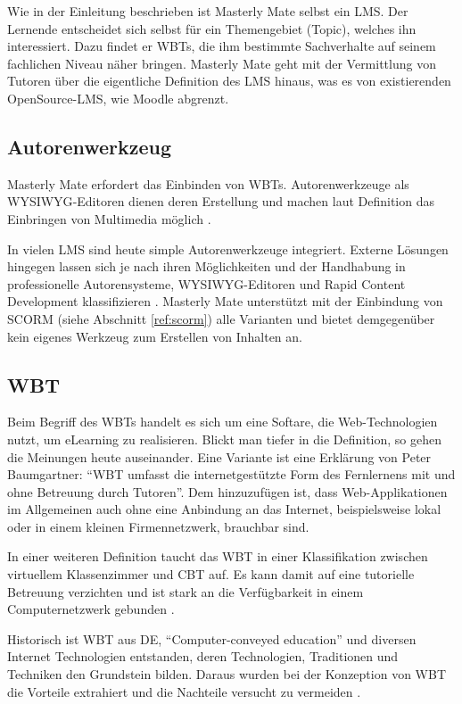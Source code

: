 Wie in der Einleitung beschrieben ist Masterly Mate selbst ein LMS. Der Lernende
entscheidet sich selbst für ein Themengebiet (Topic), welches ihn interessiert.
Dazu findet er WBTs, die ihm bestimmte Sachverhalte auf seinem fachlichen Niveau
näher bringen. Masterly Mate geht mit der Vermittlung von Tutoren über die
eigentliche Definition des LMS hinaus, was es von existierenden OpenSource-LMS,
wie Moodle abgrenzt.

\subsection{Autorenwerkzeug}
Masterly Mate erfordert das Einbinden von WBTs. Autorenwerkzeuge als
\ac{WYSIWYG}-Editoren dienen deren Erstellung und machen laut Definition das
Einbringen von Multimedia möglich \cite{niegemann:2004}. 

In vielen LMS sind heute simple Autorenwerkzeuge integriert. Externe Lösungen
hingegen lassen sich je nach ihren Möglichkeiten und der Handhabung in
professionelle Autorensysteme, WYSIWYG-Editoren und Rapid Content Development
klassifizieren \cite{niegemann:2004}. Masterly Mate unterstützt mit der
Einbindung von SCORM (siehe Abschnitt \ref{ref:scorm}) alle Varianten und bietet
demgegenüber kein eigenes Werkzeug zum Erstellen von Inhalten an.

\subsection{WBT}
Beim Begriff des WBTs handelt es sich um eine Softare, die Web-Technologien
nutzt, um eLearning zu realisieren. Blickt man tiefer in die Definition, so
gehen die Meinungen heute auseinander. Eine Variante ist eine Erklärung von
Peter Baumgartner: "`WBT umfasst die internetgestützte Form des Fernlernens mit
und ohne Betreuung durch Tutoren"'\cite{baumgartner:2002}. Dem hinzuzufügen ist,
dass Web-Applikationen im Allgemeinen auch ohne eine Anbindung an das Internet,
beispielsweise lokal oder in einem kleinen Firmennetzwerk, brauchbar sind. 

In einer weiteren Definition taucht das WBT in einer Klassifikation zwischen
virtuellem Klassenzimmer und \ac{CBT} auf. Es kann damit auf eine tutorielle
Betreuung verzichten und ist stark an die Verfügbarkeit in einem
Computernetzwerk gebunden \cite{schleifer:2003}.

Historisch ist WBT aus \ac{DE}, "`Computer-conveyed education"' und diversen
Internet Technologien entstanden, deren Technologien, Traditionen und Techniken
den Grundstein bilden. Daraus wurden bei der Konzeption von WBT die Vorteile
extrahiert und die Nachteile versucht zu vermeiden \cite{horton:2000}.

